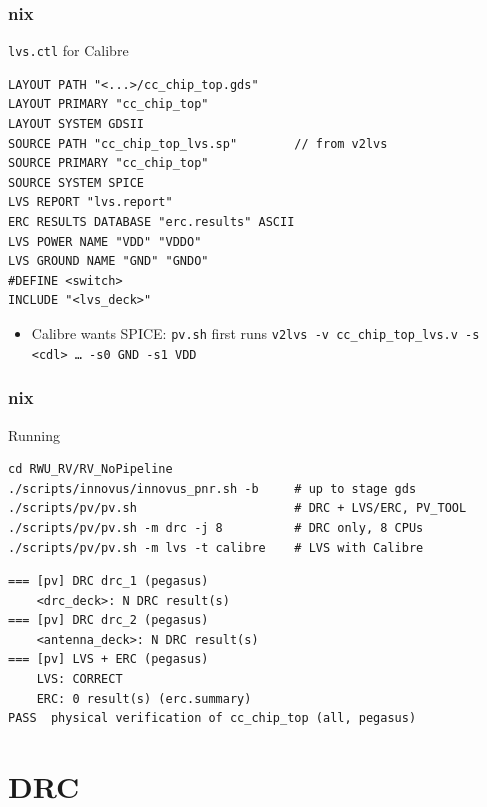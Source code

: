 \documentclass{beamer}
\newcommand{\astitle}{nix}
\newcommand{\assubtitle}{nix}
\newcommand{\cmd}[1]{\texttt{#1}}
\begin{document}
\renewcommand{\assubtitle}{\texttt{lvs.ctl} for Calibre}
\begin{frame}[fragile]
\frametitle{\astitle}
\begin{block}{\assubtitle}
\begin{lstlisting}[style=sh]
LAYOUT PATH "<...>/cc_chip_top.gds"
LAYOUT PRIMARY "cc_chip_top"
LAYOUT SYSTEM GDSII
SOURCE PATH "cc_chip_top_lvs.sp"        // from v2lvs
SOURCE PRIMARY "cc_chip_top"
SOURCE SYSTEM SPICE
LVS REPORT "lvs.report"
ERC RESULTS DATABASE "erc.results" ASCII
LVS POWER NAME "VDD" "VDDO"
LVS GROUND NAME "GND" "GNDO"
#DEFINE <switch>
INCLUDE "<lvs_deck>"
\end{lstlisting}
  \begin{itemize}
    \item Calibre wants SPICE: \cmd{pv.sh} first runs
      \cmd{v2lvs -v cc\_chip\_top\_lvs.v -s <cdl> \dots\ -s0 GND -s1 VDD}
  \end{itemize}
\end{block}
\end{frame}

\renewcommand{\assubtitle}{Running}
\begin{frame}[fragile]
\frametitle{\astitle}
\begin{block}{\assubtitle}
\begin{lstlisting}[style=sh]
cd RWU_RV/RV_NoPipeline
./scripts/innovus/innovus_pnr.sh -b     # up to stage gds
./scripts/pv/pv.sh                      # DRC + LVS/ERC, PV_TOOL
./scripts/pv/pv.sh -m drc -j 8          # DRC only, 8 CPUs
./scripts/pv/pv.sh -m lvs -t calibre    # LVS with Calibre
\end{lstlisting}
\begin{lstlisting}[style=out]
=== [pv] DRC drc_1 (pegasus)
    <drc_deck>: N DRC result(s)
=== [pv] DRC drc_2 (pegasus)
    <antenna_deck>: N DRC result(s)
=== [pv] LVS + ERC (pegasus)
    LVS: CORRECT
    ERC: 0 result(s) (erc.summary)
PASS  physical verification of cc_chip_top (all, pegasus)
\end{lstlisting}
\end{block}
\end{frame}

\section{DRC}
\renewcommand{\astitle}{DRC}
\end{document}
